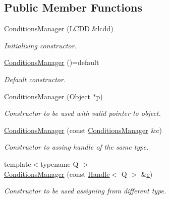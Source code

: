 \subsection*{Public Member Functions}
\begin{DoxyCompactItemize}
\item 
\hyperlink{class_d_d4hep_1_1_conditions_1_1_conditions_manager_afa92512839fc9d260fc8cfa1502a5836}{Conditions\+Manager} (\hyperlink{class_d_d4hep_1_1_geometry_1_1_l_c_d_d}{L\+C\+DD} \&lcdd)
\begin{DoxyCompactList}\small\item\em Initializing constructor. \end{DoxyCompactList}\item 
\hyperlink{class_d_d4hep_1_1_conditions_1_1_conditions_manager_a5828d94a8722ba5792c0b7960d2b7175}{Conditions\+Manager} ()=default
\begin{DoxyCompactList}\small\item\em Default constructor. \end{DoxyCompactList}\item 
\hyperlink{class_d_d4hep_1_1_conditions_1_1_conditions_manager_a01b34e91e804ce2dea5d8e363f924d29}{Conditions\+Manager} (\hyperlink{class_d_d4hep_1_1_conditions_1_1_conditions_manager_ae865f49d144d8ba5be9eec3e1d8fec94}{Object} $\ast$p)
\begin{DoxyCompactList}\small\item\em Constructor to be used with valid pointer to object. \end{DoxyCompactList}\item 
\hyperlink{class_d_d4hep_1_1_conditions_1_1_conditions_manager_a7ff6e3f2b2c93d5ac2245ce62ff5f34f}{Conditions\+Manager} (const \hyperlink{class_d_d4hep_1_1_conditions_1_1_conditions_manager}{Conditions\+Manager} \&c)
\begin{DoxyCompactList}\small\item\em Constructor to assing handle of the same type. \end{DoxyCompactList}\item 
{\footnotesize template$<$typename Q $>$ }\\\hyperlink{class_d_d4hep_1_1_conditions_1_1_conditions_manager_a8557429632d8e39c4fdcebbee00e2457}{Conditions\+Manager} (const \hyperlink{class_d_d4hep_1_1_handle}{Handle}$<$ Q $>$ \&\hyperlink{_volumes_8cpp_a8a9a1f93e9b09afccaec215310e64142}{e})
\begin{DoxyCompactList}\small\item\em Constructor to be used assigning from different type. \end{DoxyCompactList}\item 

\end{DoxyCompactItemize}
